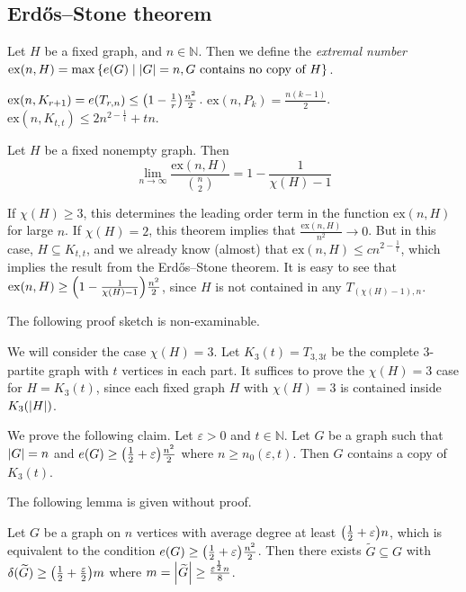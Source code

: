 \subsection{Erd\H{o}s--Stone theorem}
\begin{definition}
	Let \( H \) be a fixed graph, and \( n \in \mathbb N \).
	Then we define the \emph{extremal number} \( \mathrm{ex}(n,H) = \max\qty{e(G) \mid \abs{G} = n, G \text{ contains no copy of } H} \).
\end{definition}
\begin{example}
	\( \mathrm{ex}(n,K_{r+1}) = e(T_{r,n}) \leq \qty(1 - \frac{1}{r})\frac{n^2}{2} \).
	\( \mathrm{ex}(n,P_k) = \frac{n(k-1)}{2} \).
	\( \mathrm{ex}(n,K_{t,t}) \leq 2n^{2-\frac{1}{t}} + tn \).
\end{example}
\begin{theorem}
	Let \( H \) be a fixed nonempty graph.
	Then
	\[ \lim_{n \to \infty} \frac{\mathrm{ex}(n,H)}{\binom n 2} = 1 - \frac{1}{\chi(H) - 1} \]
\end{theorem}
\begin{remark}
	If \( \chi(H) \geq 3 \), this determines the leading order term in the function \( \mathrm{ex}(n,H) \) for large \( n \).
	If \( \chi(H) = 2 \), this theorem implies that \( \frac{\mathrm{ex}(n,H)}{n^2} \to 0 \).
	But in this case, \( H \subseteq K_{t,t} \), and we already know (almost) that \( \mathrm{ex}(n,H) \leq cn^{2-\frac{1}{t}} \), which implies the result from the Erd\H{o}s--Stone theorem.
	It is easy to see that \( \mathrm{ex}(n,H) \geq \qty(1 - \frac{1}{\chi(H) - 1}) \frac{n^2}{2} \), since \( H \) is not contained in any \( T_{(\chi(H)-1),n} \).
\end{remark}
\iffalse
The following proof sketch is non-examinable.

We will consider the case \( \chi(H) = 3 \).
Let \( K_3(t) = T_{3,3t} \) be the complete 3-partite graph with \( t \) vertices in each part.
It suffices to prove the \( \chi(H) = 3 \) case for \( H = K_3(t) \), since each fixed graph \( H \) with \( \chi(H) = 3 \) is contained inside \( K_3(\abs{H}) \).

We prove the following claim.
Let \( \varepsilon > 0 \) and \( t \in \mathbb N \).
Let \( G \) be a graph such that \( \abs{G} = n \) and \( e(G) \geq \qty(\frac{1}{2} + \varepsilon) \frac{n^2}{2} \) where \( n \geq n_0(\varepsilon,t) \).
Then \( G \) contains a copy of \( K_3(t) \).

The following lemma is given without proof.
\begin{lemma}
	Let \( G \) be a graph on \( n \) vertices with average degree at least \( \qty(\frac{1}{2} + \varepsilon)n \), which is equivalent to the condition \( e(G) \geq \qty(\frac{1}{2} + \varepsilon)\frac{n^2}{2} \).
	Then there exists \( \widetilde G \subseteq G \) with \( \delta(\widetilde G) \geq \qty(\frac{1}{2} + \frac{\varepsilon}{2})m \) where \( m = \abs{\widetilde G} \geq \frac{\varepsilon^{\frac 12} n}{8} \).
\end{lemma}


